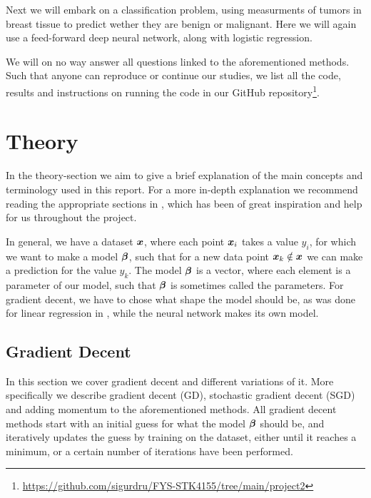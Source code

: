 \documentclass[12pt]{extarticle}
\begin{document}
Next we will embark on a classification problem, using measurments of tumors in breast tissue to predict wether they are benign or malignant. Here we will again use a feed-forward deep neural network, along with logistic regression.

We will on no way answer all questions linked to the aforementioned methods. Such that anyone can reproduce or continue our studies, we list all the code, results and instructions on running the code in our GitHub repository\footnote{\href{https://github.com/sigurdru/FYS-STK4155/tree/main/project1}{https://github.com/sigurdru/FYS-STK4155/tree/main/project2}}.

\section{Theory}
In the theory-section we aim to give a brief explanation of the main concepts and terminology used in this report. For a more in-depth explanation we recommend reading the appropriate sections in \cite{2019}, which has been of great inspiration and help for us throughout the project.

In general, we have a dataset $\boldsymbol x$, where each point $\boldsymbol x_i$ takes a value $y_i$, for which we want to make a model $\boldsymbol{\beta}$, such that for a new data point $\boldsymbol x_k \notin \boldsymbol x$ we can make a prediction for the value $y_k$.  The model $\boldsymbol{\beta}$ is a vector, where each element is a parameter of our model, such that $\boldsymbol{\beta}$ is sometimes called the parameters. For gradient decent, we have to chose what shape the model should be, as was done for linear regression in \cite{project1}, while the neural network makes its own model.

\subsection{Gradient Decent}\label{sec:GD}
In this section we cover gradient decent and different variations of it. More specifically we describe gradient decent (GD), stochastic gradient decent (SGD) and adding momentum to the aforementioned methods. All gradient decent methods start with an initial guess for what the model $\boldsymbol{\beta}$ should be, and iteratively updates the guess by training on the dataset, either until it reaches a minimum, or a certain number of iterations have been performed.
\end{document}

